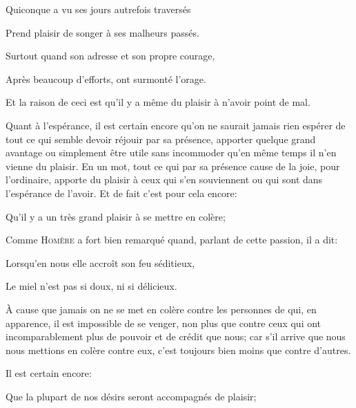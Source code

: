 \begin{emphpar}
	Quiconque a vu ses jours autrefois traversés

	Prend plaisir de songer à ses malheurs passés.

	Surtout quand son adresse et son propre courage,

	Après beaucoup d'efforts, ont surmonté l'orage.
\end{emphpar}

Et la raison de ceci est qu'il y a même du plaisir à n'avoir point de mal.

\bigbreak

Quant à l’espérance, il est certain encore qu'on ne saurait jamais rien espérer de tout ce qui semble
devoir réjouir par sa présence, apporter quelque grand avantage ou simplement être utile sans incommoder
qu'en même temps il n'en vienne du plaisir. En un mot, tout ce qui par sa présence cause de la joie, pour
l'ordinaire, apporte du plaisir à ceux qui s'en souviennent ou qui sont dans l'espérance de l'avoir. Et
de fait c'est pour cela encore:

\begin{lieu}
	Qu'il y a un très grand plaisir à se mettre en colère;
\end{lieu}

Comme \textsc{Homère} a fort bien remarqué quand, parlant de cette passion, il a dit:

\begin{emphpar}
	Lorsqu'en nous elle accroît son feu séditieux,

	Le miel n'est pas si doux, ni si délicieux.
\end{emphpar}

À cause que jamais on ne se met en colère contre les personnes de qui, en apparence, il est impossible de se
venger, non plus que contre ceux qui ont incomparablement plus de pouvoir et de crédit que nous; car s'il
arrive que nous nous mettions en colère contre eux, c'est toujours bien moins que contre d'autres.

\bigbreak

Il est certain encore:

\begin{lieu}
	Que la plupart de nos désirs seront accompagnés de plaisir;
\end{lieu}

